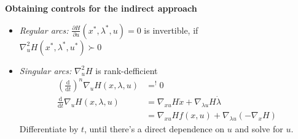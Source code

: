 \begin{tcolorbox}[colback=gray!5!white,colframe=gray!75!black,title=\textbf{Indirect Approach}]
\textbf{Obtaining controls for the indirect approach}\\

\begin{itemize}
\item \emph{Regular arcs:} $\frac{\partial H}{\partial u}(x^*,\lambda^*, u) = 0$
  is invertible, if\\ \mbox{$\nabla^2_u H(x^*,\lambda^*,u^*)\succ 0$}
\item \emph{Singular arcs:} $\nabla^2_u H$ is rank-defficient
  \begin{align*}
    \left(
    \frac{\mathrm{d}}{\mathrm{d}t}
    \right)^n \nabla_u H(x,\lambda,u) &=^! 0 \\
    \frac{\mathrm{d}}{\mathrm{d}t} \nabla_u H(x,\lambda,u) &= \nabla_{xu} H \dot{x} + \nabla_{\lambda u} H\dot{\lambda} \\
                                      &= \nabla_{x u} H f(x,u) + \nabla_{\lambda u}(-\nabla_x H)
  \end{align*}
  Differentiate by $t$, until there's a direct dependence on $u$ and solve for
  $u$.
\end{itemize}
\end{tcolorbox}
